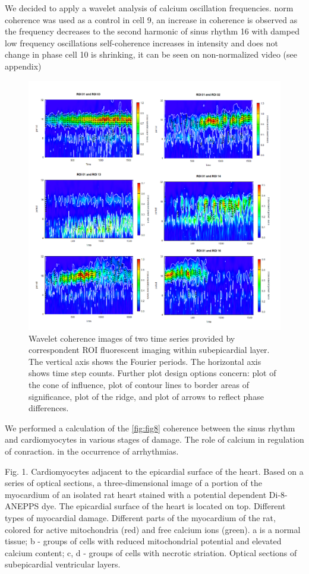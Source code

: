 \documentclass{biophys-new}
\begin{document}
We decided to apply a wavelet analysis of calcium oscillation frequencies. \cite{addison2018introduction}
norm coherence was used as a control
in cell 9, an increase in coherence is observed as the frequency decreases to the second harmonic of sinus rhythm
16 with damped low frequency oscillations
self-coherence increases in intensity and does not change in phase
cell 10 is shrinking, it can be seen on non-normalized video (see appendix)

\begin{figure}[hbt!]
\centering
\includegraphics[width=0.8\linewidth]{fig9.png}
\caption{Wavelet coherence images of two time series provided by correspondent ROI fluorescent imaging within subepicardial layer.
The vertical axis shows the Fourier periods. The horizontal axis shows time step counts.
Further plot design options concern: plot of the cone of influence, plot of contour lines to border areas of significance, plot of the ridge, and plot of arrows to reflect phase differences.}
\label{fig:fig9}
\end{figure}


We performed a calculation of the \ref{fig:fig8} coherence between the sinus rhythm and cardiomyocytes in various stages of damage.
The role of calcium in regulation of conraction.
in the occurrence of arrhythmias.


Fig. 1. Cardiomyocytes adjacent to the epicardial surface of the heart.
Based on a series of optical sections, a three-dimensional image of a portion of the myocardium of an isolated rat heart stained with a potential dependent Di-8-ANEPPS dye.
The epicardial surface of the heart is located on top.
Different types of myocardial damage.
Different parts of the myocardium of the rat, colored for active mitochondria (red) and free calcium ions (green). a is a normal tissue; b - groups of cells with reduced mitochondrial potential and elevated calcium content; c, d - groups of cells with necrotic striation. Optical sections of subepicardial ventricular layers.
\end{document}
